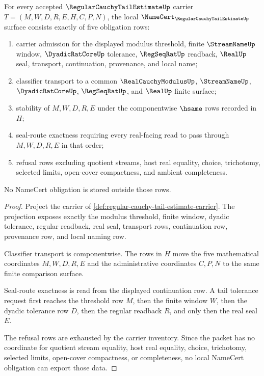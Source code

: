 \begin{theorem}
\label{thm:regular-cauchy-tail-estimate-namecert-obligations}
For every accepted $\RegularCauchyTailEstimateUp$ carrier
$T=(M,W,D,R,E,H,C,P,N)$, the local
$\NameCert_{\RegularCauchyTailEstimateUp}$ surface consists exactly of five
obligation rows:
\begin{enumerate}
\item carrier admission for the displayed modulus threshold, finite
$\StreamNameUp$ window, $\DyadicRatCoreUp$ tolerance, $\RegSeqRatUp$ readback,
$\RealUp$ seal, transport, continuation, provenance, and local name;
\item classifier transport to a common $\RealCauchyModulusUp$,
$\StreamNameUp$, $\DyadicRatCoreUp$, $\RegSeqRatUp$, and $\RealUp$ finite
surface;
\item stability of $M,W,D,R,E$ under the componentwise $\hsame$ rows recorded
in $H$;
\item seal-route exactness requiring every real-facing read to pass through
$M,W,D,R,E$ in that order;
\item refusal rows excluding quotient streams, host real equality, choice,
trichotomy, selected limits, open-cover compactness, and ambient completeness.
\end{enumerate}
No NameCert obligation is stored outside those rows.
\end{theorem}
\begin{proof}
Project the carrier of
\autoref{def:regular-cauchy-tail-estimate-carrier}. The projection exposes
exactly the modulus threshold, finite window, dyadic tolerance, regular
readback, real seal, transport rows, continuation row, provenance row, and
local naming row.

Classifier transport is componentwise. The rows in $H$ move the five
mathematical coordinates $M,W,D,R,E$ and the administrative coordinates
$C,P,N$ to the same finite comparison surface.

Seal-route exactness is read from the displayed continuation row. A tail
tolerance request first reaches the threshold row $M$, then the finite window
$W$, then the dyadic tolerance row $D$, then the regular readback $R$, and only
then the real seal $E$.

The refusal rows are exhausted by the carrier inventory. Since the packet has
no coordinate for quotient stream equality, host real equality, choice,
trichotomy, selected limits, open-cover compactness, or completeness, no local
NameCert obligation can export those data.
\end{proof}

